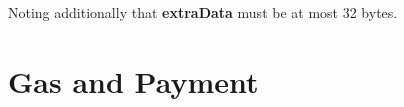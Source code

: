 \documentclass[9pt,oneside]{amsart}
\begin{document}
\begin{multicols}{2}
Noting additionally that \textbf{extraData} must be at most 32 bytes.

\section{Gas and Payment} \label{ch:payment}





\end{multicols}
\end{document}
